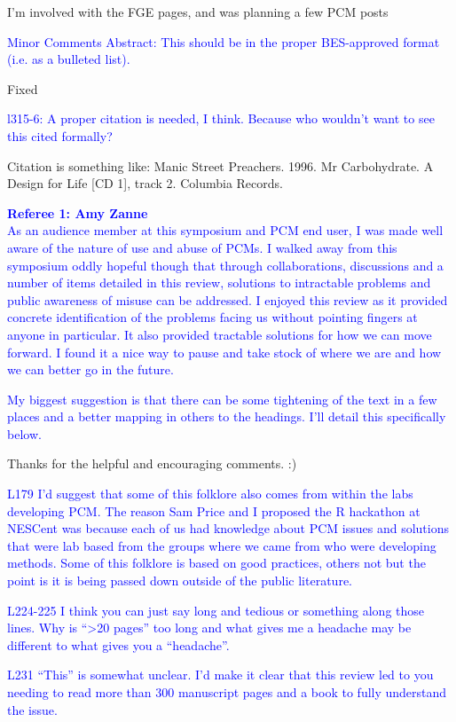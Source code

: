 \documentclass[12pt]{letter}
\begin{document}
\begin{letter}{}
I'm involved with the FGE pages, and was planning a few PCM posts 

\textcolor{blue}{Minor Comments
Abstract: This should be in the proper BES-approved format (i.e. as a bulleted list).}

Fixed

\textcolor{blue}{l315-6: A proper citation is needed, I think. Because who wouldn't want to see this cited formally?}

Citation is something like: Manic Street Preachers. 1996. Mr Carbohydrate. A Design for Life [CD 1], track 2. Columbia Records.

\textcolor{blue}{\textbf{Referee 1: Amy Zanne}}\\

\textcolor{blue}{As an audience member at this symposium and PCM end user, I was made well aware of the nature of use and abuse of PCMs. I walked away from this symposium oddly hopeful though that through collaborations, discussions and a number of items detailed in this review, solutions to intractable problems and public awareness of misuse can be addressed. I enjoyed this review as it provided concrete identification of the problems facing us without pointing fingers at anyone in particular. It also provided tractable solutions for how we can move forward. I found it a nice way to pause and take stock of where we are and how we can better go in the future.}

\textcolor{blue}{My biggest suggestion is that there can be some tightening of the text in a few places and a better mapping in others to the headings. I’ll detail this specifically below.}

Thanks for the helpful and encouraging comments. :)

\textcolor{blue}{L179 I’d suggest that some of this folklore also comes from within the labs developing PCM. The reason Sam Price and I proposed the R hackathon at NESCent was because each of us had knowledge about PCM issues and solutions that were lab based from the groups where we came from who were developing methods. Some of this folklore is based on good practices, others not but the point is it is being passed down outside of the public literature.}

\textcolor{blue}{L224-225 I think you can just say long and tedious or something along those lines. Why is “>20 pages” too long and what gives me a headache may be different to what gives you a “headache”.}

\textcolor{blue}{L231 “This” is somewhat unclear. I’d make it clear that this review led to you needing to read more than 300 manuscript pages and a book to fully understand the issue.}


\end{letter}
\end{document}

